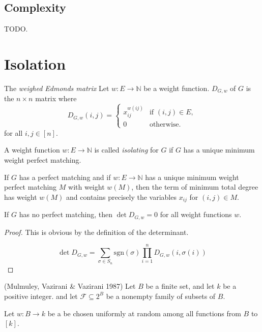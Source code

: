 \documentclass{beamer}
\newcommand{\nn}{\mathbb{N}}
\begin{document}
\begin{frame}

  \subsection{Complexity}
  TODO.

  \section{Isolation}


  The \emph{weighed Edmonds matrix} Let $w : E \to \nn$ be a weight
  function. $D_{G,w}$ of $G$ is the $n \times n$ matrix where
  \[
    D_{G,w}(i, j) =
    \begin{cases}
      x_{ij}^{w(ij)} & \text{if } (i, j) \in E, \\
      0              & \text{otherwise}.
    \end{cases}
  \]
  for all $i, j \in [n]$.

  \begin{definition}
    A weight function $w : E \to \nn$ is called \emph{isolating} for
    $G$ if $G$ has a unique minimum weight perfect matching.
  \end{definition}

  \begin{lemma}
    If $G$ has a perfect matching and
    if $w : E \to \nn$ has a unique minimum weight perfect matching $M$
    with weight $w(M)$,
    then the term of minimum total degree has weight $w(M)$
    and contains precisely the variables $x_{ij}$ for $(i, j) \in M$.

    If $G$ has no perfect matching, then $\det D_{G,w} = 0$ for all
    weight functions $w$.
  \end{lemma}

  \begin{proof}
    This is obvious by the definition of the determinant.

    \[
      \det D_{G,w} = \sum_{\sigma \in S_n} \text{sgn}(\sigma) \prod_{i
        = 1}^n D_{G,w}(i, \sigma(i))
    \]
  \end{proof}

  \begin{lemma}(Mulmuley, Vazirani \& Vazirani 1987)
    Let $B$ be a finite set,
    and let $k$ be a positive integer.
    and let $\mathcal{F} \subseteq 2^B$ be a nonempty family of
    subsets of $B$.

    Let $w : B \to k$ be a be chosen uniformly at random
    among all functions from $B$ to $[k]$.


\end{lemma}
\end{frame}
\end{document}
